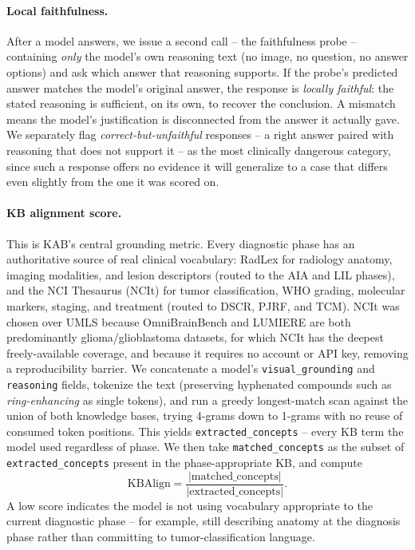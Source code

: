\documentclass[11pt]{article}
\begin{document}
\paragraph{Local faithfulness.} After a model answers, we issue a second call -- the faithfulness probe -- containing \emph{only} the model's own reasoning text (no image, no question, no answer options) and ask which answer that reasoning supports. If the probe's predicted answer matches the model's original answer, the response is \emph{locally faithful}: the stated reasoning is sufficient, on its own, to recover the conclusion. A mismatch means the model's justification is disconnected from the answer it actually gave. We separately flag \emph{correct-but-unfaithful} responses -- a right answer paired with reasoning that does not support it -- as the most clinically dangerous category, since such a response offers no evidence it will generalize to a case that differs even slightly from the one it was scored on.

\paragraph{KB alignment score.} This is KAB's central grounding metric. Every diagnostic phase has an authoritative source of real clinical vocabulary: RadLex \citep{rsna_radlex} for radiology anatomy, imaging modalities, and lesion descriptors (routed to the AIA and LIL phases), and the NCI Thesaurus (NCIt) for tumor classification, WHO grading, molecular markers, staging, and treatment (routed to DSCR, PJRF, and TCM). NCIt was chosen over UMLS because OmniBrainBench and LUMIERE are both predominantly glioma/glioblastoma datasets, for which NCIt has the deepest freely-available coverage, and because it requires no account or API key, removing a reproducibility barrier. We concatenate a model's \texttt{visual\_grounding} and \texttt{reasoning} fields, tokenize the text (preserving hyphenated compounds such as \emph{ring-enhancing} as single tokens), and run a greedy longest-match scan against the union of both knowledge bases, trying 4-grams down to 1-grams with no reuse of consumed token positions. This yields \texttt{extracted\_concepts} -- every KB term the model used regardless of phase. We then take \texttt{matched\_concepts} as the subset of \texttt{extracted\_concepts} present in the phase-appropriate KB, and compute
\begin{equation}
  \label{eq:kb-align}
  \text{KBAlign} = \frac{|\text{matched\_concepts}|}{|\text{extracted\_concepts}|}.
\end{equation}
A low score indicates the model is not using vocabulary appropriate to the current diagnostic phase -- for example, still describing anatomy at the diagnosis phase rather than committing to tumor-classification language.
\end{document}
